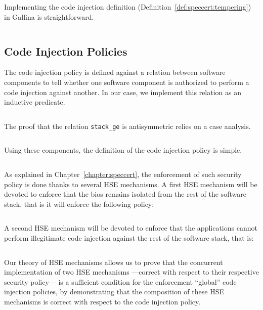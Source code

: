 Implementing the code injection definition
(Definition~\ref{def:speccert:tempering}) in Gallina is straightforward.

\inputminted[gobble=2,firstline=338,lastline=344]{coq}{Listings/SpecCert.v}

\subsection{Code Injection Policies}

The code injection policy is defined against a relation between software
components to tell whether one software component is authorized to perform a
code injection against another.
%
In our case, we implement this relation as an inductive predicate.

\inputminted[gobble=2,firstline=274,lastline=281]{coq}{Listings/SpecCert.v}

The proof that the relation \texttt{stack\_ge} is antisymmetric relies on a
case analysis.

\inputminted[gobble=2,firstline=586,lastline=592]{coq}{Listings/SpecCert.v}

Using these components, the definition of the code injection policy is simple.

\inputminted[gobble=2,firstline=346,lastline=352]{coq}{Listings/SpecCert.v}

As explained in Chapter~\ref{chapter:speccert}, the enforcement of such security
policy is done thanks to several HSE mechanisms.
%
A first HSE mechanism will be devoted to enforce that the \ac{bios} remains
isolated from the rest of the software stack, that is it will enforce the
following policy:

\inputminted[gobble=2,firstline=539,lastline=545]{coq}{Listings/SpecCert.v}

A second HSE mechanism will be devoted to enforce that the applications cannot
perform illegitimate code injection against the rest of the software stack, that
is:

\inputminted[gobble=2,firstline=547,lastline=554]{coq}{Listings/SpecCert.v}

Our theory of HSE mechanisms allows us to prove that the concurrent
implementation of two HSE mechanisms ---correct with respect to their respective
security policy--- is a sufficient condition for the enforcement ``global'' code
injection policies, by demonstrating that the composition of these HSE
mechanisms is correct with respect to the code injection policy.

\inputminted[gobble=2,firstline=556,lastline=583]{coq}{Listings/SpecCert.v}
